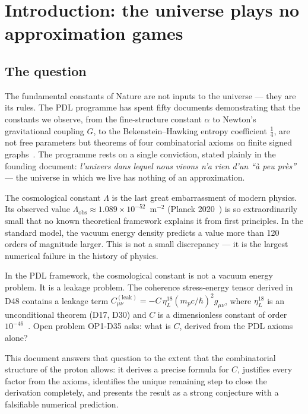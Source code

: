 \documentclass[12pt,a4paper]{article}
\newcommand{\hb}{\hbar}
\newcommand{\etaL}{\eta_L}
\newcommand{\Lam}{\Lambda}
\begin{document}
\tableofcontents
\newpage

\section{Introduction: the universe plays no approximation games}
\label{sec:intro}

\subsection{The question}

The fundamental constants of Nature are not inputs to the universe — they are its rules. The PDL programme has spent fifty documents demonstrating that the constants we observe, from the fine-structure constant $\alpha$ to Newton's gravitational coupling $G$, to the Bekenstein--Hawking entropy coefficient $\tfrac{1}{4}$, are not free parameters but theorems of four combinatorial axioms on finite signed graphs~\cite{PDL_D01_2026,PDL_D12_2026,PDL_D50_2026}. The programme rests on a single conviction, stated plainly in the founding document: \emph{l'univers dans lequel nous vivons n'a rien d'un ``à peu près''} — the universe in which we live has nothing of an approximation.

The cosmological constant $\Lam$ is the last great embarrassment of modern physics. Its observed value $\Lam_{\mathrm{obs}} \approx 1.089 \times 10^{-52}$~m$^{-2}$ (Planck 2020~\cite{Planck2020}) is so extraordinarily small that no known theoretical framework explains it from first principles. In the standard model, the vacuum energy density predicts a value more than 120 orders of magnitude larger. This is not a small discrepancy — it is the largest numerical failure in the history of physics.

In the PDL framework, the cosmological constant is not a vacuum energy problem. It is a leakage problem. The coherence stress-energy tensor derived in D48 contains a leakage term $C^{(\mathrm{leak})}_{\mu\nu} = -C\,\etaL^{18}(m_p c/\hb)^2 g_{\mu\nu}$, where $\etaL^{18}$ is an unconditional theorem (D17, D30) and $C$ is a dimensionless constant of order $10^{-46}$~\cite{PDL_D48_2026}. Open problem OP1-D35 asks: what is $C$, derived from the PDL axioms alone?

This document answers that question to the extent that the combinatorial structure of the proton allows: it derives a precise formula for $C$, justifies every factor from the axioms, identifies the unique remaining step to close the derivation completely, and presents the result as a strong conjecture with a falsifiable numerical prediction.
\end{document}
